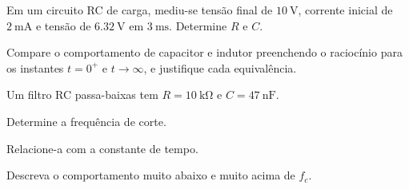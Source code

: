 \begin{questao}[3]{}

Em um circuito RC de carga, mediu-se tensão final de $\SI{10}{\volt}$,
corrente inicial de $\SI{2}{\milli\ampere}$ e tensão de $\SI{6.32}{\volt}$ em
$\SI{3}{\milli\second}$. Determine $R$ e $C$.


\end{questao}
\begin{questao}[3]{}

Compare o comportamento de capacitor e indutor preenchendo o raciocínio para os
instantes $t=0^{+}$ e $t\to\infty$, e justifique cada equivalência.


\end{questao}
\begin{questao}[3]{}

Um filtro RC passa-baixas tem $R=\SI{10}{\kilo\ohm}$ e
$C=\SI{47}{\nano\farad}$.
\begin{itensq}
\item Determine a frequência de corte.
\item Relacione-a com a constante de tempo.
\item Descreva o comportamento muito abaixo e muito acima de $f_c$.
\end{itensq}


\end{questao}

